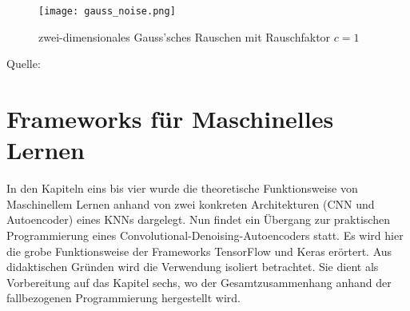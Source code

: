 \begin{figure}[h!]
  \centering
  \texttt{[image: gauss\_noise.png]}
  \caption{zwei-dimensionales Gauss'sches Rauschen mit Rauschfaktor $c=1$}
\end{figure}
\para{}
Quelle: \cite{wiki:gauss_noise}


\chapter{Frameworks für Maschinelles Lernen}
In den Kapiteln eins bis vier wurde die theoretische Funktionsweise von
Maschinellem Lernen anhand von zwei konkreten Architekturen (CNN und
Autoencoder) eines KNNs dargelegt.
Nun findet ein Übergang zur praktischen Programmierung eines
Convolutional-Denoising-Autoencoders statt. Es wird hier die grobe Funktionsweise der
Frameworks TensorFlow und Keras erörtert. Aus didaktischen Gründen wird die
Verwendung isoliert betrachtet.
Sie dient als Vorbereitung auf das Kapitel sechs, wo der Gesamtzusammenhang anhand der
fallbezogenen Programmierung hergestellt wird.
\para{}
\bigskip

